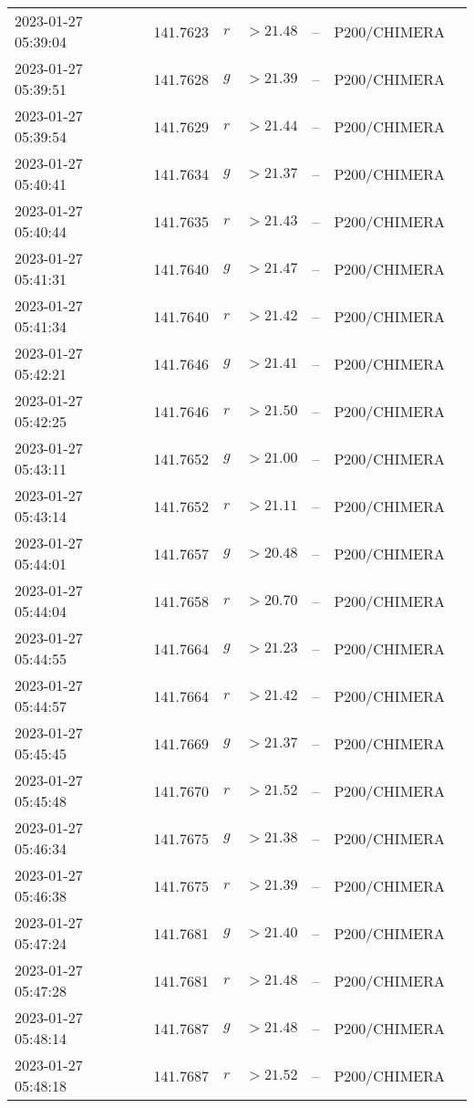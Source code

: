 \documentclass{nature_plusfigure}
\begin{document}
\begin{supplement}
\begin{center}
\begin{longtable}{lllllll}
2023-01-27 05:39:04 & 141.7623 & $r$ & $>21.48$ & -- & P200/CHIMERA &  \\ 
2023-01-27 05:39:51 & 141.7628 & $g$ & $>21.39$ & -- & P200/CHIMERA &  \\ 
2023-01-27 05:39:54 & 141.7629 & $r$ & $>21.44$ & -- & P200/CHIMERA &  \\ 
2023-01-27 05:40:41 & 141.7634 & $g$ & $>21.37$ & -- & P200/CHIMERA &  \\ 
2023-01-27 05:40:44 & 141.7635 & $r$ & $>21.43$ & -- & P200/CHIMERA &  \\ 
2023-01-27 05:41:31 & 141.7640 & $g$ & $>21.47$ & -- & P200/CHIMERA &  \\ 
2023-01-27 05:41:34 & 141.7640 & $r$ & $>21.42$ & -- & P200/CHIMERA &  \\ 
2023-01-27 05:42:21 & 141.7646 & $g$ & $>21.41$ & -- & P200/CHIMERA &  \\ 
2023-01-27 05:42:25 & 141.7646 & $r$ & $>21.50$ & -- & P200/CHIMERA &  \\ 
2023-01-27 05:43:11 & 141.7652 & $g$ & $>21.00$ & -- & P200/CHIMERA &  \\ 
2023-01-27 05:43:14 & 141.7652 & $r$ & $>21.11$ & -- & P200/CHIMERA &  \\ 
2023-01-27 05:44:01 & 141.7657 & $g$ & $>20.48$ & -- & P200/CHIMERA &  \\ 
2023-01-27 05:44:04 & 141.7658 & $r$ & $>20.70$ & -- & P200/CHIMERA &  \\ 
2023-01-27 05:44:55 & 141.7664 & $g$ & $>21.23$ & -- & P200/CHIMERA &  \\ 
2023-01-27 05:44:57 & 141.7664 & $r$ & $>21.42$ & -- & P200/CHIMERA &  \\ 
2023-01-27 05:45:45 & 141.7669 & $g$ & $>21.37$ & -- & P200/CHIMERA &  \\ 
2023-01-27 05:45:48 & 141.7670 & $r$ & $>21.52$ & -- & P200/CHIMERA &  \\ 
2023-01-27 05:46:34 & 141.7675 & $g$ & $>21.38$ & -- & P200/CHIMERA &  \\ 
2023-01-27 05:46:38 & 141.7675 & $r$ & $>21.39$ & -- & P200/CHIMERA &  \\ 
2023-01-27 05:47:24 & 141.7681 & $g$ & $>21.40$ & -- & P200/CHIMERA &  \\ 
2023-01-27 05:47:28 & 141.7681 & $r$ & $>21.48$ & -- & P200/CHIMERA &  \\ 
2023-01-27 05:48:14 & 141.7687 & $g$ & $>21.48$ & -- & P200/CHIMERA &  \\ 
2023-01-27 05:48:18 & 141.7687 & $r$ & $>21.52$ & -- & P200/CHIMERA &  \\ 

\end{longtable}
\end{center}
\end{supplement}
\end{document}
